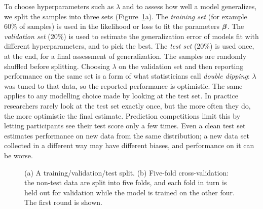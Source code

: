 To choose hyperparameters such as $\lambda$ and to assess how well a model generalizes, we split the samples into three sets (Figure~\ref{fig:splits}a). The \emph{training set} (for example 60\% of samples) is used in the likelihood or loss to fit the parameters $\boldsymbol{\beta}$. The \emph{validation set} (20\%) is used to estimate the generalization error of models fit with different hyperparameters, and to pick the best. The \emph{test set} (20\%) is used once, at the end, for a final assessment of generalization. The samples are randomly shuffled before splitting. Choosing $\lambda$ on the validation set and then reporting performance on the same set is a form of what statisticians call \emph{double dipping}: $\lambda$ was tuned to that data, so the reported performance is optimistic. The same applies to any modelling choice made by looking at the test set. In practice researchers rarely look at the test set exactly once, but the more often they do, the more optimistic the final estimate. Prediction competitions limit this by letting participants see their test score only a few times. Even a clean test set estimates performance on new data from the same distribution; a new data set collected in a different way may have different biases, and performance on it can be worse.

\begin{figure}[t]
  \centering
  \caption{(a) A training/validation/test split. (b) Five-fold cross-validation: the non-test data are split into five folds, and each fold in turn is held out for validation while the model is trained on the other four. The first round is shown.}
  \label{fig:splits}
\end{figure}

